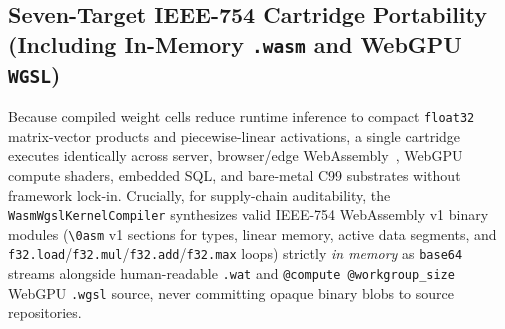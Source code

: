 \documentclass[11pt,a4paper]{article}
\begin{document}
\subsection{Seven-Target IEEE-754 Cartridge Portability (Including In-Memory \texttt{.wasm} and WebGPU \texttt{WGSL})}
Because compiled weight cells reduce runtime inference to compact \texttt{float32} matrix-vector products and piecewise-linear activations, a single cartridge executes identically across server, browser/edge WebAssembly~\cite{haas2017wasm}, WebGPU compute shaders, embedded SQL, and bare-metal C99 substrates without framework lock-in. Crucially, for supply-chain auditability, the \texttt{WasmWgslKernelCompiler} synthesizes valid IEEE-754 WebAssembly v1 binary modules (\texttt{\textbackslash0asm} v1 sections for types, linear memory, active data segments, and \texttt{f32.load}/\texttt{f32.mul}/\texttt{f32.add}/\texttt{f32.max} loops) strictly \emph{in memory} as \texttt{base64} streams alongside human-readable \texttt{.wat} and \texttt{@compute @workgroup\_size} WebGPU \texttt{.wgsl} source, never committing opaque binary blobs to source repositories.
\end{document}

